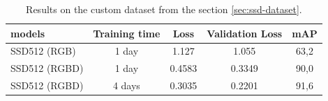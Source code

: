 \documentclass[a4paper,12pt,titlepage]{article}
\numberwithin{figure}{section}
\begin{document}
\begin{table}
\centering
\begin{tabular}{|l|c|c|c|c|}
  \hline
  models & Training time & Loss & Validation Loss & mAP \\
  \hline
  SSD512 (RGB) & 1 day & 1.127 & 1.055 & 63,2 \\
  \hline
  SSD512 (RGBD) & 1 day & 0.4583 & 0.3349 & 90,0 \\
  \hline
  SSD512 (RGBD) & 4 days & 0.3035 & 0.2201 & 91,6 \\
  \hline
\end{tabular}
\caption{Results on the custom dataset from the section \ref{sec:ssd-dataset}.}
\label{tab:ssd_camparison}
\end{table}


{}
\cleardoublepage
\clearpage
\end{document}

